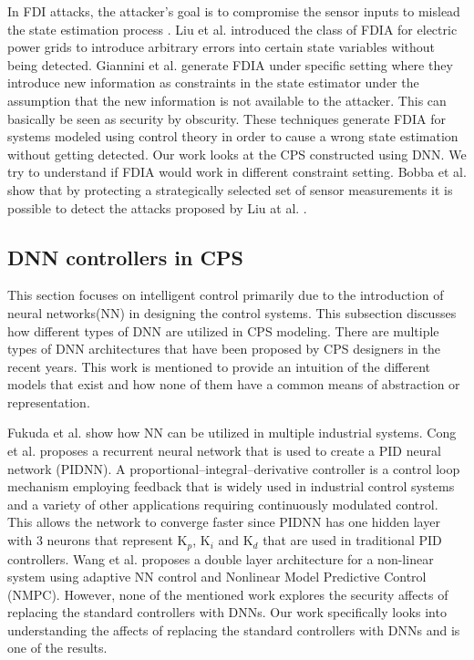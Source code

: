 In FDI attacks, the attacker's goal is to compromise the sensor inputs to mislead the state estimation process \cite{e3f0020abba24d4389aff937fe8bcdd5}. Liu et al. \cite{10.1145/1952982.1952995} introduced the class of FDIA for electric power grids to introduce arbitrary errors into certain state variables without being detected. Giannini et al. \cite{unknown} generate FDIA under specific setting %
where they introduce new information as constraints in the state estimator under the assumption that the new information is not available to the attacker. This can basically be seen as security by obscurity. These techniques generate FDIA for systems modeled using control theory in order to cause a wrong state estimation without getting detected. Our work looks at the CPS constructed using \ac{DNN}. We try to understand if \ac{FDIA} would work in different constraint setting. Bobba et al. \cite{Bobba2010DetectingFD} show that by protecting a strategically selected set of sensor measurements it is possible to detect the attacks proposed by Liu at al. \cite{10.1145/1952982.1952995}.

\subsection{DNN controllers in CPS}
This section focuses on intelligent control primarily due to the introduction of neural networks(NN) in designing the control systems. This subsection discusses how different types of \ac{DNN} are utilized in \ac{CPS} modeling. There are multiple types of \ac{DNN} architectures that have been proposed by \ac{CPS} designers in the recent years. This work is mentioned to provide an intuition of the different models that exist and how none of them have a common means of abstraction or representation.   %


Fukuda et al. \cite{170966} show how NN can be utilized in multiple industrial systems. Cong et al. \cite{Cong} proposes a recurrent neural network that is used to create a PID neural network (PIDNN). A proportional–integral–derivative controller is a control loop mechanism employing feedback that is widely used in industrial control systems and a variety of other applications requiring continuously modulated control. This allows the network to converge faster since PIDNN has one hidden layer with 3 neurons that represent K$_p$, K$_i$ and K$_d$ that are used in traditional PID controllers. Wang et al. \cite{Wang2016ACA} proposes a double layer architecture for a non-linear system using adaptive NN control and Nonlinear Model Predictive Control (NMPC). However, none of the mentioned work explores the security affects of replacing the standard controllers with DNNs. Our work specifically looks into understanding the affects of replacing the standard controllers with DNNs and \attack is one of the results.

